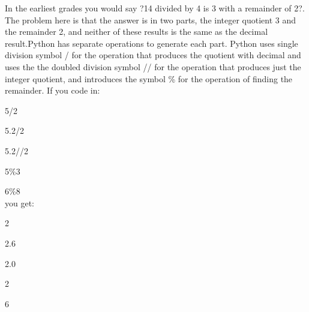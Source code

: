   In the earliest grades you would say ?14 divided by 4 is 3 with a remainder of 2?. The problem here is that the answer is in two parts, the integer quotient 3 and the remainder 2, and neither of these results is the same as the decimal result.Python has separate operations to generate each part. Python uses single division symbol / for the operation that produces  the quotient with decimal and uses the the doubled division symbol // for the operation that produces just the integer quotient, and introduces the symbol \% for the operation of finding the remainder. If you code in:
  
  5/2
  
  5.2/2
  
  5.2//2
  
  5\%3
  
  6\%8\\
  
  you get:
  
  2
  
  2.6
  
  2.0
  
  2
  
  6
 

